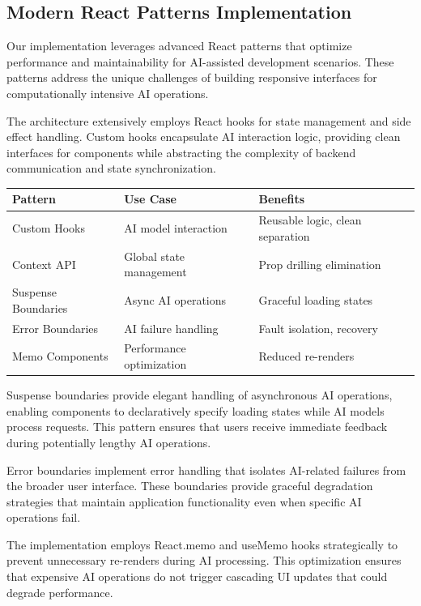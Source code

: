 \subsection*{Modern React Patterns Implementation}

Our implementation leverages advanced React patterns that optimize performance and maintainability for AI-assisted development scenarios. These patterns address the unique challenges of building responsive interfaces for computationally intensive AI operations.

The architecture extensively employs React hooks for state management and side effect handling. Custom hooks encapsulate AI interaction logic, providing clean interfaces for components while abstracting the complexity of backend communication and state synchronization.

\begin{center}
\begin{tabular}{@{}lll@{}}
\toprule
\textbf{Pattern} & \textbf{Use Case} & \textbf{Benefits} \\
\midrule
Custom Hooks & AI model interaction & Reusable logic, clean separation \\
Context API & Global state management & Prop drilling elimination \\
Suspense Boundaries & Async AI operations & Graceful loading states \\
Error Boundaries & AI failure handling & Fault isolation, recovery \\
Memo Components & Performance optimization & Reduced re-renders \\
\bottomrule
\end{tabular}
\end{center}

Suspense boundaries provide elegant handling of asynchronous AI operations, enabling components to declaratively specify loading states while AI models process requests. This pattern ensures that users receive immediate feedback during potentially lengthy AI operations.

Error boundaries implement error handling that isolates AI-related failures from the broader user interface. These boundaries provide graceful degradation strategies that maintain application functionality even when specific AI operations fail.

The implementation employs React.memo and useMemo hooks strategically to prevent unnecessary re-renders during AI processing. This optimization ensures that expensive AI operations do not trigger cascading UI updates that could degrade performance.


